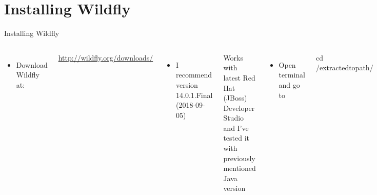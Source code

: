 \documentclass[aspectratio=1610,english]{beamer} %
\begin{document}
	\section{Installing Wildfly}
	\begin{frame}{Installing Wildfly}
		\begin{columns}
				\begin{itemize}
					\tiny
					\color{black}
					\item Download Wildfly at:
				\end{itemize}
				\fontsize{4}{5} \selectfont
				\url{http://wildfly.org/downloads/} 
				\begin{itemize}
					\tiny
					\color{black}
					\item I recommend version 14.0.1.Final (2018-09-05)
				\end{itemize}
				\fontsize{4}{5} \selectfont
				Works with latest Red Hat (JBoss) Developer Studio \\
					and I've tested it with previously mentioned Java version
					
				\begin{itemize}
					\tiny
					\color{black}
					\item Open terminal and go to
				\end{itemize}
				\fontsize{4}{5} \selectfont
				cd /extracted\textunderscore to\textunderscore path/
				
				\begin{itemize}
					\tiny
					\color{black}
					\item Change file permission
				\end{itemize}
				\fontsize{4}{5} \selectfont
				chmod -R 777 /wildfly-14.0.1.Final
				
				\begin{itemize}
					\tiny
					\color{black}
					\item Add new users (management or application):
				\end{itemize}
				\fontsize{4}{5} \selectfont
				.../wildfly-14.0.1.Final/bin/add-user.sh
				

\end{columns}
\end{frame}
\end{document}
